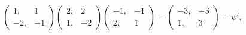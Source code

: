 \[
\begin{pmatrix} 1, & 1 \\ -2, & -1 \end{pmatrix}
\begin{pmatrix} 2, & 2 \\ 1, & -2 \end{pmatrix}
\begin{pmatrix} -1, & -1 \\ 2, & 1 \end{pmatrix}
=
\begin{pmatrix} -3, & -3 \\ 1, & 3 \end{pmatrix}
= \psi',
\]
